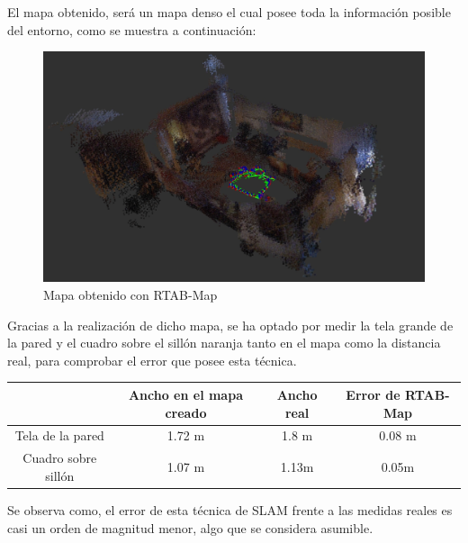 El mapa obtenido, será un mapa denso el cual posee toda la información posible del entorno, como se muestra a continuación:
\begin{figure}[h!]
    \centering
    \includegraphics[width=.9\textwidth]{images/slam/bag1_rtabmapbonito}
    \caption{Mapa obtenido con RTAB-Map}
\end{figure}

Gracias a la realización de dicho mapa, se ha optado por medir la tela grande de la pared y el cuadro sobre el sillón naranja tanto en el mapa como la distancia real, para comprobar
el error que posee esta técnica.

\begin{center}
\begin{tabular}{ c | c | c | c }
     & Ancho en el mapa creado & Ancho real & Error de RTAB-Map\\
     \hline
     Tela de la pared & 1.72 m & 1.8 m & 0.08 m\\
     Cuadro sobre sillón & 1.07 m & 1.13m & 0.05m\\
\end{tabular}
\end{center}

Se observa como, el error de esta técnica de SLAM frente a las medidas reales es casi un orden de magnitud menor, algo que se considera asumible.


